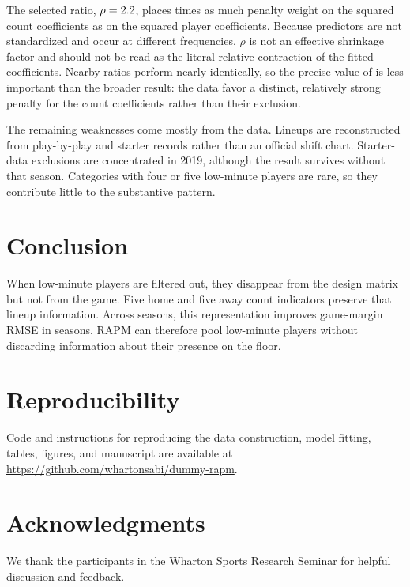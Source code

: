 \documentclass[12pt]{article}
\begin{document}
The selected ratio, $\rho=2.2$, places
\SelectedPenaltyRatio{} times as much penalty weight on the squared count
coefficients as on the squared player coefficients. Because predictors are not
standardized and occur at different frequencies, $\rho$ is not an effective
shrinkage factor and should not be read as the literal relative contraction of
the fitted coefficients. Nearby ratios perform nearly identically, so the
precise value of \SelectedPenaltyRatio{} is less important than the broader
result: the data favor a distinct, relatively strong penalty for the count
coefficients rather than their exclusion.

The remaining weaknesses come mostly from the data. Lineups are reconstructed
from play-by-play and starter records rather than an official shift chart.
Starter-data exclusions are concentrated in 2019, although the result survives
without that season. Categories with four or five low-minute players are rare,
so they contribute little to the substantive pattern.

\section{Conclusion}

When low-minute players are filtered out, they disappear from the design
matrix but not from the game. Five home and five away count indicators preserve
that lineup information. Across \NumberSeasons{} seasons, this representation
improves game-margin RMSE in \RMSEWins{} seasons. RAPM can therefore pool
low-minute players without discarding information about their presence on the
floor.

\section*{Reproducibility}

Code and instructions for reproducing the data construction, model fitting,
tables, figures, and manuscript are available at
\url{https://github.com/whartonsabi/dummy-rapm}.

\section*{Acknowledgments}

We thank the participants in the Wharton Sports Research Seminar for helpful
discussion and feedback.

{\footnotesize
\setlength{\bibsep}{4pt}


}
\end{document}
